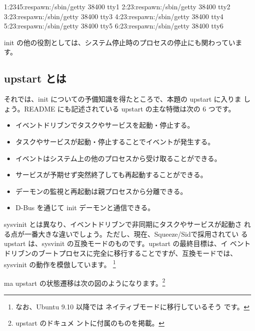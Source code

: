 \documentclass[mingoth,a4paper]{jsarticle}
\begin{document}
\begin{commandline}
1:2345:respawn:/sbin/getty 38400 tty1
2:23:respawn:/sbin/getty 38400 tty2
3:23:respawn:/sbin/getty 38400 tty3
4:23:respawn:/sbin/getty 38400 tty4
5:23:respawn:/sbin/getty 38400 tty5
6:23:respawn:/sbin/getty 38400 tty6
\end{commandline}

init の他の役割としては、システム停止時のプロセスの停止にも関わっていま
す。

\subsection{upstart とは}

それでは、init についての予備知識を得たところで、本題の upstart に入りま
しょう。README にも記述されている upstart の主な特徴は次の 6 つです。

\begin{itemize}
 \item イベントドリブンでタスクやサービスを起動・停止する。
 \item タスクやサービスが起動・停止することでイベントが発生する。
 \item イベントはシステム上の他のプロセスから受け取ることができる。
 \item サービスが予期せず突然終了しても再起動することができる。
 \item デーモンの監視と再起動は親プロセスから分離できる。
 \item D-Bus を通じて init デーモンと通信できる。
\end{itemize}

sysvinit とは異なり、イベントドリブンで非同期にタスクやサービスが起動さ
れる点が一番大きな違いでしょう。ただし、現在、Squeeze/Sidで採用されてい
る upstart は、sysvinit の互換モードのものです。upstart の最終目標は、イ
ベントドリブンのブートプロセスに完全に移行することですが、互換モードでは、
sysvinit の動作を模倣しています。
\footnote{なお、Ubuntu 9.10 以降では ネイティブモードに移行しているそう
です。}

ma
upstart の状態遷移は次の図のようになります。\footnote{upstart のドキュメ
ントに付属のものを掲載。}
\end{document}
